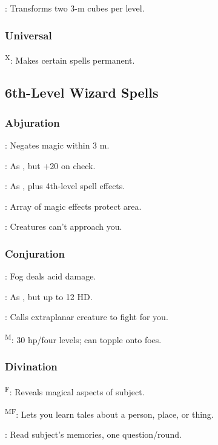 	: Transforms two 3-m cubes per level.

\subsubsection{Universal}
	\textsuperscript{X}: Makes certain spells permanent.



\subsection{6th-Level Wizard Spells}

\subsubsection{Abjuration}
	: Negates magic within 3 m.

	: As , but +20 on check.

	: As , plus 4th-level spell effects.

	: Array of magic effects protect area.

	: Creatures can't approach you.

\subsubsection{Conjuration}
	: Fog deals acid damage.

	: As , but up to 12 HD.

	: Calls extraplanar creature to fight for you.

	\textsuperscript{M}: 30 hp/four levels; can topple onto foes.

\subsubsection{Divination}
	\textsuperscript{F}: Reveals magical aspects of subject.

	\textsuperscript{MF}: Lets you learn tales about a person, place, or thing.

	: Read subject's memories, one question/round.

